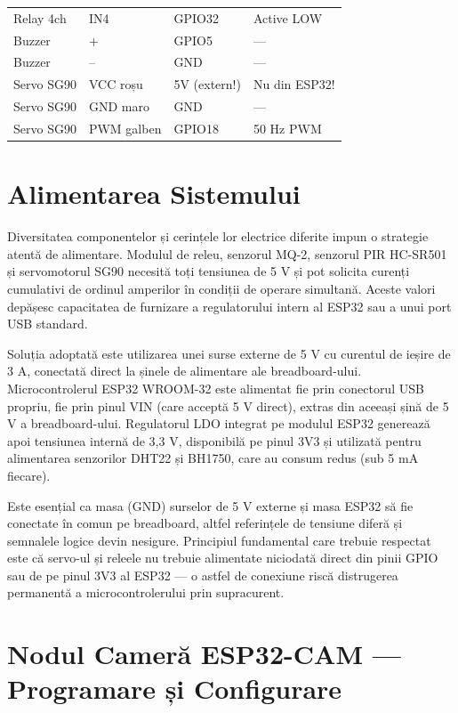 \documentclass[12pt, twoside, a4paper]{report}
\begin{document}
\begin{table}[H]
\begin{tabular}{llll}
Relay 4ch       & IN4       & GPIO32         & Active LOW             \\
Buzzer          & +         & GPIO5          & ---                    \\
Buzzer          & --        & GND            & ---                    \\
Servo SG90      & VCC roșu  & 5V (extern!)   & Nu din ESP32!          \\
Servo SG90      & GND maro  & GND            & ---                    \\
Servo SG90      & PWM galben & GPIO18        & 50 Hz PWM              \\
\bottomrule
\end{tabular}
\end{table}

\section{Alimentarea Sistemului}

Diversitatea componentelor și cerințele lor electrice diferite impun o strategie atentă
de alimentare. Modulul de releu, senzorul MQ-2, senzorul PIR HC-SR501 și servomotorul
SG90 necesită toți tensiunea de 5 V și pot solicita curenți cumulativi de ordinul
amperilor în condiții de operare simultană. Aceste valori depășesc capacitatea de
furnizare a regulatorului intern al ESP32 sau a unui port USB standard.

Soluția adoptată este utilizarea unei surse externe de 5 V cu curentul de ieșire de
3 A, conectată direct la șinele de alimentare ale breadboard-ului. Microcontrolerul
ESP32 WROOM-32 este alimentat fie prin conectorul USB propriu, fie prin pinul VIN
(care acceptă 5 V direct), extras din aceeași șină de 5 V a breadboard-ului. Regulatorul
LDO integrat pe modulul ESP32 generează apoi tensiunea internă de 3,3 V, disponibilă
pe pinul 3V3 și utilizată pentru alimentarea senzorilor DHT22 și BH1750, care au
consum redus (sub 5 mA fiecare).

Este esențial ca masa (GND) surselor de 5 V externe și masa ESP32 să fie conectate în
comun pe breadboard, altfel referințele de tensiune diferă și semnalele logice devin
nesigure. Principiul fundamental care trebuie respectat este că servo-ul și releele nu
trebuie alimentate niciodată direct din pinii GPIO sau de pe pinul 3V3 al ESP32 ---
o astfel de conexiune riscă distrugerea permanentă a microcontrolerului prin supracurent.

\section{Nodul Cameră ESP32-CAM --- Programare și Configurare}
\label{sec:espcam-prog}
\end{document}
